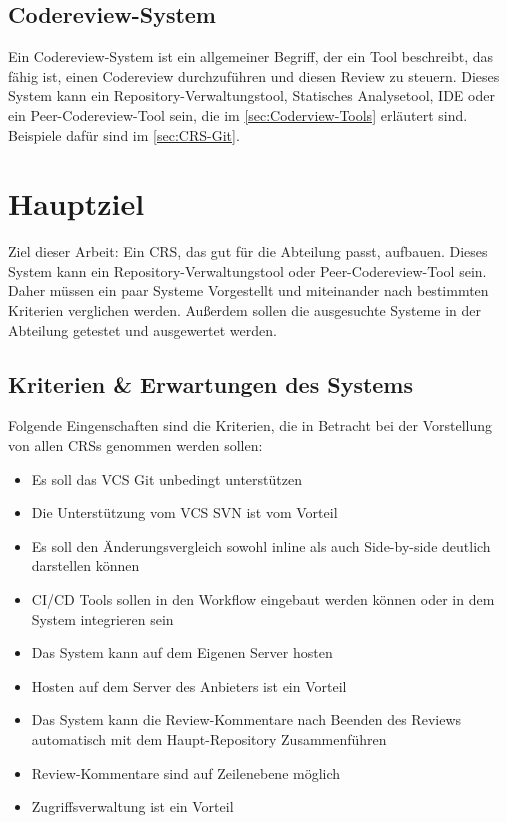 \subsection{Codereview-System}
\label{subsec:CRS}

Ein Codereview-System ist ein allgemeiner Begriff, der ein Tool beschreibt, das fähig ist, einen Codereview durchzuführen und diesen Review zu steuern. Dieses System kann ein Repository-Verwaltungstool, Statisches Analysetool, IDE oder ein Peer-Codereview-Tool sein, die im \cref{sec:Coderview-Tools} erläutert sind. Beispiele dafür sind im \cref{sec:CRS-Git}.

\section{Hauptziel}
\label{sec:Ziel}

Ziel dieser Arbeit: Ein \ac{CRS}, das gut für die Abteilung passt, aufbauen. Dieses System kann ein Repository-Verwaltungstool oder Peer-Codereview-Tool sein. Daher müssen ein paar Systeme Vorgestellt und miteinander nach bestimmten Kriterien verglichen werden. Außerdem sollen die ausgesuchte Systeme in der Abteilung getestet und ausgewertet werden.


\subsection{Kriterien \& Erwartungen des Systems}
\label{sec:kriterien}

Folgende Eingenschaften sind die Kriterien, die in Betracht bei der Vorstellung von allen \acp{CRS} genommen werden sollen:

\begin{itemize}
	\item Es soll das \ac{VCS} Git unbedingt unterstützen
	\item Die Unterstützung vom \ac{VCS} \ac{SVN} ist vom Vorteil
	\item Es soll den Änderungsvergleich sowohl inline als auch Side-by-side deutlich darstellen können
	\item \ac{CI}/\ac{CD} Tools sollen in den Workflow eingebaut werden können oder in dem System integrieren sein
	\item Das System kann auf dem Eigenen Server hosten
	\item Hosten auf dem Server des Anbieters ist ein Vorteil
	\item Das System kann die Review-Kommentare nach Beenden des Reviews automatisch mit dem Haupt-Repository Zusammenführen
	\item Review-Kommentare sind auf Zeilenebene möglich
	\item Zugriffsverwaltung ist ein Vorteil
\end{itemize}
